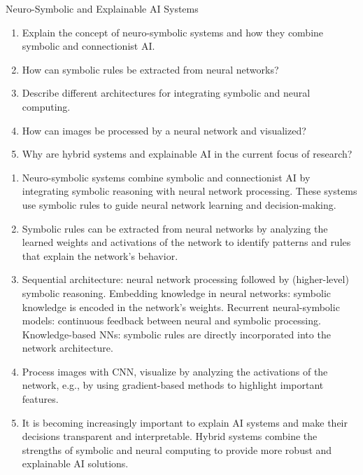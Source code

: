 \documentclass{article}
\begin{document}
\begin{exercise}{Neuro-Symbolic and Explainable AI Systems}
  \begin{enumerate}
    \item Explain the concept of neuro-symbolic systems and how they combine symbolic and connectionist AI.
    \item How can symbolic rules be extracted from neural networks?
    \item Describe different architectures for integrating symbolic and neural computing.
    \item How can images be processed by a neural network and visualized?
    \item Why are hybrid systems and explainable AI in the current focus of research?
  \end{enumerate}

  \begin{solution}
    \begin{enumerate}
      \item Neuro-symbolic systems combine symbolic and connectionist AI by integrating symbolic reasoning with neural network processing. These systems use symbolic rules to guide neural network learning and decision-making.
      \item Symbolic rules can be extracted from neural networks by analyzing the learned weights and activations of the network to identify patterns and rules that explain the network's behavior.
      \item Sequential architecture: neural network processing followed by (higher-level) symbolic reasoning. Embedding knowledge in neural networks: symbolic knowledge is encoded in the network's weights. Recurrent neural-symbolic models: continuous feedback between neural and symbolic processing. Knowledge-based NNs: symbolic rules are directly incorporated into the network architecture.
      \item Process images with CNN, visualize by analyzing the activations of the network, e.g., by using gradient-based methods to highlight important features.
      \item It is becoming increasingly important to explain AI systems and make their decisions transparent and interpretable. Hybrid systems combine the strengths of symbolic and neural computing to provide more robust and explainable AI solutions.
    \end{enumerate}
  \end{solution}
\end{exercise}
\end{document}
